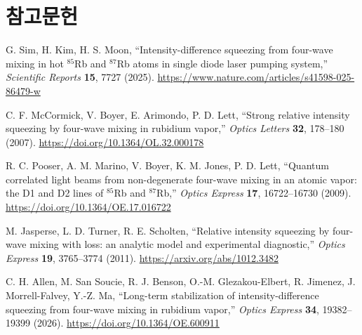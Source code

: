 \documentclass[11pt,a4paper]{article}
\begin{document}
\section{참고문헌}

\begin{enumerate}[label={[\arabic*]},leftmargin=*]
\item G. Sim, H. Kim, H. S. Moon, ``Intensity-difference squeezing from four-wave mixing
      in hot $^{85}$Rb and $^{87}$Rb atoms in single diode laser pumping system,''
      \textit{Scientific Reports} \textbf{15}, 7727 (2025).
      \url{https://www.nature.com/articles/s41598-025-86479-w}
\item C. F. McCormick, V. Boyer, E. Arimondo, P. D. Lett,
      ``Strong relative intensity squeezing by four-wave mixing in rubidium vapor,''
      \textit{Optics Letters} \textbf{32}, 178--180 (2007).
      \url{https://doi.org/10.1364/OL.32.000178}
\item R. C. Pooser, A. M. Marino, V. Boyer, K. M. Jones, P. D. Lett,
      ``Quantum correlated light beams from non-degenerate four-wave mixing in an atomic vapor:
      the D1 and D2 lines of $^{85}$Rb and $^{87}$Rb,''
      \textit{Optics Express} \textbf{17}, 16722--16730 (2009).
      \url{https://doi.org/10.1364/OE.17.016722}
\item M. Jasperse, L. D. Turner, R. E. Scholten,
      ``Relative intensity squeezing by four-wave mixing with loss: an analytic model and
      experimental diagnostic,'' \textit{Optics Express} \textbf{19}, 3765--3774 (2011).
      \url{https://arxiv.org/abs/1012.3482}
\item C. H. Allen, M. San Soucie, R. J. Benson, O.-M. Glezakou-Elbert, R. Jimenez,
      J. Morrell-Falvey, Y.-Z. Ma,
      ``Long-term stabilization of intensity-difference squeezing from four-wave mixing in
      rubidium vapor,'' \textit{Optics Express} \textbf{34}, 19382--19399 (2026).
      \url{https://doi.org/10.1364/OE.600911}
\end{enumerate}
\end{document}

